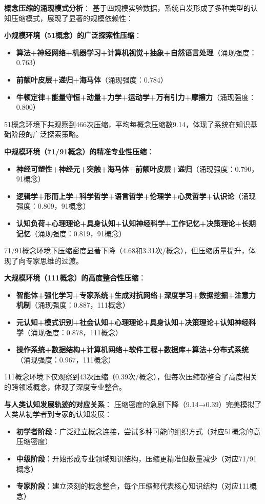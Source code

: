 \documentclass[12pt,a4paper]{article}
\begin{document}
\textbf{概念压缩的涌现模式分析}：
基于四规模实验数据，系统自发形成了多种类型的认知压缩模式，展现了显著的规模依赖性：

\textbf{小规模环境（51概念）的广泛探索性压缩}：
\begin{itemize}
    \item \textbf{算法+神经网络+机器学习+计算机视觉+抽象+自然语言处理}（涌现强度：0.763）
    \item \textbf{前额叶皮层+递归+海马体}（涌现强度：0.784）
    \item \textbf{牛顿定律+能量守恒+动量+力学+运动学+万有引力+摩擦力}（涌现强度：0.800）
\end{itemize}
51概念环境下共观察到466次压缩，平均每概念压缩数9.14，体现了系统在知识基础阶段的广泛探索策略。

\textbf{中规模环境（71/91概念）的精准专业性压缩}：
\begin{itemize}
    \item \textbf{神经可塑性+神经元+突触+海马体+前额叶皮层+递归}（涌现强度：0.790，91概念）
    \item \textbf{逻辑学+形而上学+科学哲学+语言哲学+伦理学+心灵哲学+认识论}（涌现强度：0.809，91概念）
    \item \textbf{认知负荷+心理理论+具身认知+认知神经科学+工作记忆+决策理论+长期记忆}（涌现强度：0.819，91概念）
\end{itemize}
71/91概念环境下压缩密度显著下降（4.68和3.31次/概念），但压缩质量提升，体现了向专家思维的过渡。

\textbf{大规模环境（111概念）的高度整合性压缩}：
\begin{itemize}
    \item \textbf{智能体+强化学习+专家系统+生成对抗网络+深度学习+数据挖掘+注意力机制}（涌现强度：0.887，111概念）
    \item \textbf{元认知+模式识别+社会认知+心理理论+具身认知+决策理论+认知神经科学}（涌现强度：0.878，111概念）
    \item \textbf{操作系统+数据结构+计算机网络+软件工程+数据库+算法+分布式系统}（涌现强度：0.967，111概念）
\end{itemize}
111概念环境下仅观察到43次压缩（0.39次/概念），但每次压缩都整合了高度相关的跨领域概念，体现了深度专业整合。

\textbf{与人类认知发展轨迹的对应关系}：
压缩密度的急剧下降（9.14→0.39）完美模拟了人类从初学者到专家的认知发展：
\begin{itemize}
    \item \textbf{初学者阶段}：广泛建立概念连接，尝试多种可能的组织方式（对应51概念的高压缩密度）
    \item \textbf{中级阶段}：开始形成专业领域知识结构，压缩更精准但数量减少（对应71/91概念）
    \item \textbf{专家阶段}：建立深刻的概念整合，每个压缩都代表核心知识结构（对应111概念）
\end{itemize}
\end{document}
